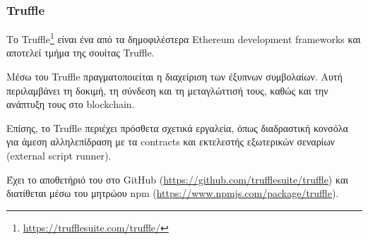 \subsubsection{Truffle} \label{subsection:4-2-3-1-truffle}


Το Truffle\footnote{\url{https://trufflesuite.com/truffle/}} είναι ένα από τα δημοφιλέστερα Ethereum development frameworks και αποτελεί τμήμα της σουίτας Truffle.

Μέσω του Truffle πραγματοποιείται η διαχείριση των έξυπνων συμβολαίων. Αυτή περιλαμβάνει τη δοκιμή, τη σύνδεση και τη μεταγλώττισή τους, καθώς και την ανάπτυξη τους στο blockchain.

Επίσης, το Truffle περιέχει πρόσθετα σχετικά εργαλεία, όπως διαδραστική κονσόλα για άμεση αλληλεπίδραση με τα contracts  και εκτελεστής εξωτερικών σεναρίων (external script runner). 

Έχει το αποθετήριό του στο GitHub (\url{https://github.com/trufflesuite/truffle}) και διατίθεται μέσω του μητρώου npm (\url{https://www.npmjs.com/package/truffle}).